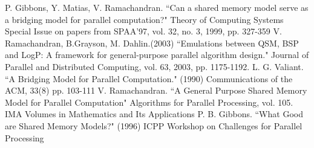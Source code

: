 \documentclass[12pt,a4paper]{article}
\begin{document}
\newpage
\singlespace
\begin{thebibliography}{9}

 P. Gibbons, Y. Matias, V. Ramachandran. ``Can a shared memory model serve as a bridging model for parallel computation?" Theory of Computing Systems Special Issue on papers from SPAA'97, vol. 32, no. 3, 1999, pp. 327-359
 V. Ramachandran, B.Grayson, M. Dahlin.(2003) ``Emulations between QSM, BSP and LogP: A framework for general-purpose parallel algorithm design." Journal of Parallel and Distributed Computing, vol. 63, 2003, pp. 1175-1192. 
 L. G. Valiant. ``A Bridging Model for Parallel Computation." (1990) Communications of the ACM, 33(8) pp. 103-111
 V. Ramachandran. ``A General Purpose Shared Memory Model for Parallel Computation" Algorithms for Parallel Processing, vol. 105. IMA
Volumes in Mathematics and Its Applications
 P. B. Gibbons. ``What Good are Shared Memory Models?" (1996) ICPP Workshop on Challenges for Parallel Processing
\end{thebibliography}
\end{document}
